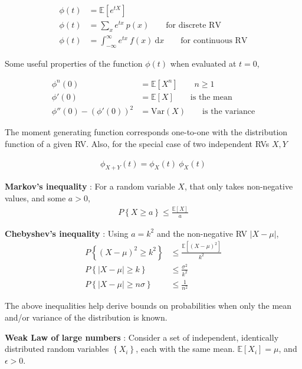 \begin{align}
	\phi(t) &= \mathbb{E}[e^{tX}] \\
	\phi(t) &= \sum_{x} e^{tx} \ p(x) \qquad \text{for discrete RV} \\
	\phi(t) &= \int_{-\infty}^{\infty} e^{tx}\ f(x)\ \mathrm{d}x \qquad \text{for continuous RV} 
\end{align}

Some useful properties of the function $ \phi(t) $ when evaluated at $ t = 0 $,

\begin{align}
	\phi^n (0) &= \mathbb{E}[X^n] \qquad n \geq 1 \\
	\phi'(0) &= \mathbb{E}[X] \qquad \text{is the mean} \\
	\phi''(0) - \left(\phi'(0)\right)^2 &= \mathrm{Var}(X) \qquad \text{is the variance}
\end{align}

The moment generating function corresponds one-to-one with the distribution function of a given RV. Also, for the special case of two independent RVs $ X, Y $

\begin{align}
	\phi_{X + Y}(t) = 	\phi_{X}(t)\ \phi_{X}(t)
\end{align}

\textbf{Markov's inequality} : For a random variable $ X $, that only takes non-negative values, and some $ a > 0 $,
\begin{align}
	P\left\{ X \geq a \right\} \leq \frac{\mathbb{E}[X]}{a}
\end{align}

\textbf{Chebyshev's inequality} : Using $ a = k^2 $ and the non-negative RV $\left| X - \mu \right|$,
\begin{align}
	P\left\{( X - \mu)^2 \geq k^2 \right\} &\leq \frac{\mathbb{E}[(X - \mu)^2]}{k^2} \nonumber \\
	P\left\{\left| X - \mu \right| \geq k\right\} &\leq \frac{\sigma^2}{k^2} \nonumber \\
	P\left\{\left| X - \mu \right| \geq n\sigma \right\} &\leq \frac{1}{n^2}
\end{align}

The above inequalities help derive bounds on probabilities when only the mean and/or variance of the distribution is known.

\textbf{Weak Law of large numbers} : Consider a set of independent, identically distributed random variables $ \left\{X_i\right\} $, each with the same mean. $ \mathbb{E}[X_i] = \mu $, and $ \epsilon > 0 $.

